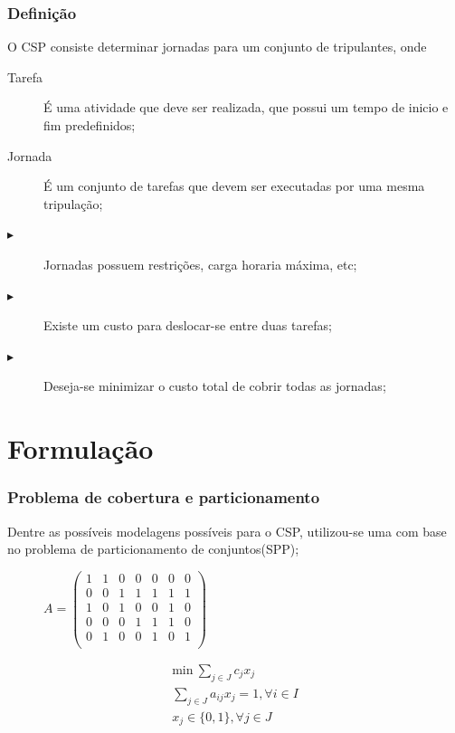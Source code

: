 \documentclass{beamer}
\begin{document}
\begin{frame}
    \frametitle{Definição}

    O CSP consiste determinar jornadas para um conjunto de tripulantes, onde

    \begin{description}
        \item[Tarefa] É uma atividade que deve ser realizada, que possui um tempo de inicio e fim predefinidos;
        \item[Jornada] É um conjunto de tarefas que devem ser executadas por uma mesma tripulação;
        \item[$\blacktriangleright$]Jornadas possuem restrições, carga horaria máxima, etc;
        \item[$\blacktriangleright$]Existe um custo para deslocar-se entre duas tarefas;
        \item[$\blacktriangleright$]Deseja-se minimizar o custo total de cobrir todas as jornadas;
    \end{description}
\end{frame}

\section{Formulação}
\begin{frame}
    \frametitle{Problema de cobertura e particionamento}
    Dentre as possíveis modelagens possíveis para o CSP, utilizou-se uma com base no problema de particionamento de conjuntos(SPP);

    \begin{figure}[!htb]
        \centering
        \begin{minipage}{0.48\textwidth}
            $A = \begin{pmatrix}
                1 & 1 & 0 & 0 & 0 & 0 & 0 \\
                0 & 0 & 1 & 1 & 1 & 1 & 1 \\
                1 & 0 & 1 & 0 & 0 & 1 & 0 \\
                0 & 0 & 0 & 1 & 1 & 1 & 0 \\
                0 & 1 & 0 & 0 & 1 & 0 & 1 \\
            \end{pmatrix}$
        \end{minipage}
%
        \begin{minipage}{.48\textwidth}
            \begin{subequations}
                \label{spppp}
                \begin{align}
                \label{spp2}  \text{min} \: \sum_{j \in J} c_j x_j \\
                \label{spp22} \sum_{j \in J} a_{ij} x_j = 1, \forall i \in I \\
                \label{spp24} x_j \in \{0, 1\}, \forall j \in J
            \end{align}
        \end{subequations}
        \end{minipage}
    \end{figure}
\end{frame}
\end{document}
